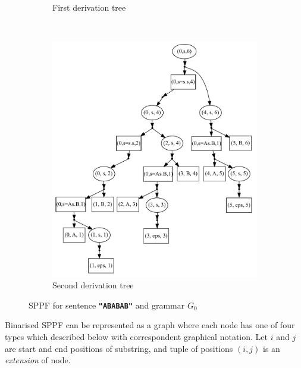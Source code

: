 \begin{figure}[ht]
\begin{center}
\begin{subfigure}[b]{0.3\textwidth}
        \caption{First derivation tree}
        \label{tree1}        
    \end{subfigure}
    ~
    \begin{subfigure}[b]{0.3\textwidth}
        \includegraphics[width=\textwidth]{dot/Brackets2.pdf}
        \caption{Second derivation tree}
        \label{tree2}        
    \end{subfigure}
    \caption{SPPF for sentence \textbf{\texttt{"ABABAB"}} and grammar $G_0$}
    \label{sppfSample}
    \end{center}                
\end{figure}

Binarised SPPF can be represented as a graph where each node has one of four types which described below with correspondent graphical notation.
Let $i$ and $j$ are start and end positions of substring, and tuple of positions $(i,j)$ is an \textit{extension} of node.

